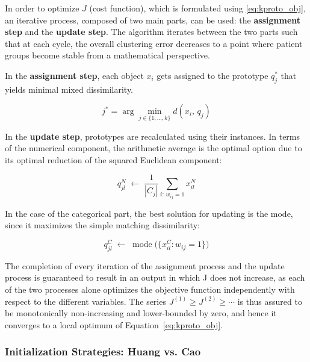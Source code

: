 In order to optimize $J$ (cost function), which is formulated using \eqref{eq:kproto_obj}, an iterative process, composed of two main parts, can be used: the \textbf{assignment step} and the \textbf{update step}. The algorithm iterates between the two parts such that at each cycle, the overall clustering error decreases to a point where patient groups become stable from a mathematical perspective.

\vspace{0.5em}

In the \textbf{assignment step}, each object $x_i$ gets assigned to the prototype $q_j^*$ that yields minimal mixed dissimilarity.

\begin{equation}
    j^* = \arg\min_{j \in \{1,\ldots,k\}} d(x_i,\, q_j)
\end{equation}

In the \textbf{update step}, prototypes are recalculated using their instances. In terms of the numerical component, the arithmetic average is the optimal option due to its optimal reduction of the squared Euclidean component:

\begin{equation}
    q_{jl}^{N} \;\leftarrow\; \frac{1}{|C_j|}\sum_{i:\, w_{ij}=1} x_{il}^{N}
\end{equation}

In the case of the categorical part, the best solution for updating is the mode, since it maximizes the simple matching dissimilarity:

\begin{equation}
    q_{jl}^{C} \;\leftarrow\; \operatorname{mode}\bigl(\{x_{il}^{C} : w_{ij} = 1\}\bigr)
\end{equation}

The completion of every iteration of the assignment process and the update process is guaranteed to result in an output in which J does not increase, as each of the two processes alone optimizes the objective function independently with respect to the different variables. The series $J^{(1)} \geq J^{(2)} \geq \cdots$ is thus assured to be monotonically non-increasing and lower-bounded by zero, and hence it converges to a local optimum of Equation~\eqref{eq:kproto_obj}.

\subsubsection*{Initialization Strategies: Huang vs. Cao}


